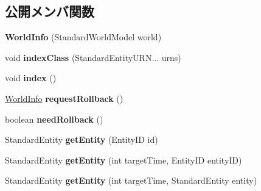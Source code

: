 \subsection*{公開メンバ関数}
\begin{DoxyCompactItemize}
\item 
\hypertarget{classadf_1_1agent_1_1info_1_1WorldInfo_af2e76c5ecc9ae11756e12f370a630f5d}{}\label{classadf_1_1agent_1_1info_1_1WorldInfo_af2e76c5ecc9ae11756e12f370a630f5d} 
{\bfseries World\+Info} (Standard\+World\+Model world)
\item 
\hypertarget{classadf_1_1agent_1_1info_1_1WorldInfo_a295ba9da2d5d52c0133e8dda46354e68}{}\label{classadf_1_1agent_1_1info_1_1WorldInfo_a295ba9da2d5d52c0133e8dda46354e68} 
void {\bfseries index\+Class} (Standard\+Entity\+U\+R\+N... urns)
\item 
\hypertarget{classadf_1_1agent_1_1info_1_1WorldInfo_a373b42e6c2fc1deab8963ee63c97a8e1}{}\label{classadf_1_1agent_1_1info_1_1WorldInfo_a373b42e6c2fc1deab8963ee63c97a8e1} 
void {\bfseries index} ()
\item 
\hypertarget{classadf_1_1agent_1_1info_1_1WorldInfo_a2c65bcb041b80e7d4ddb46156935ef1b}{}\label{classadf_1_1agent_1_1info_1_1WorldInfo_a2c65bcb041b80e7d4ddb46156935ef1b} 
\hyperlink{classadf_1_1agent_1_1info_1_1WorldInfo}{World\+Info} {\bfseries request\+Rollback} ()
\item 
\hypertarget{classadf_1_1agent_1_1info_1_1WorldInfo_a1e1b2688e4a439a93b7ac5e1a0555ca8}{}\label{classadf_1_1agent_1_1info_1_1WorldInfo_a1e1b2688e4a439a93b7ac5e1a0555ca8} 
boolean {\bfseries need\+Rollback} ()
\item 
\hypertarget{classadf_1_1agent_1_1info_1_1WorldInfo_aab4f629458f301ce51f5384bd740f0ff}{}\label{classadf_1_1agent_1_1info_1_1WorldInfo_aab4f629458f301ce51f5384bd740f0ff} 
Standard\+Entity {\bfseries get\+Entity} (Entity\+ID id)
\item 
\hypertarget{classadf_1_1agent_1_1info_1_1WorldInfo_a0d02585d36eb96ac2ae568e3a171a91b}{}\label{classadf_1_1agent_1_1info_1_1WorldInfo_a0d02585d36eb96ac2ae568e3a171a91b} 
Standard\+Entity {\bfseries get\+Entity} (int target\+Time, Entity\+ID entity\+ID)
\item 
\hypertarget{classadf_1_1agent_1_1info_1_1WorldInfo_a445145db6e9e050040c66435f66626ef}{}\label{classadf_1_1agent_1_1info_1_1WorldInfo_a445145db6e9e050040c66435f66626ef} 
Standard\+Entity {\bfseries get\+Entity} (int target\+Time, Standard\+Entity entity)
\item 
\hypertarget{classadf_1_1agent_1_1info_1_1WorldInfo_aff90f52ae10170804ee2f45526d54c12}{}\label{classadf_1_1agent_1_1info_1_1WorldInfo_aff90f52ae10170804ee2f45526d54c12} 

\end{DoxyCompactItemize}
